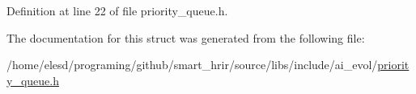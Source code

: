 Definition at line 22 of file priority\-\_\-queue.\-h.



The documentation for this struct was generated from the following file\-:\begin{DoxyCompactItemize}
\item 
/home/elesd/programing/github/smart\-\_\-hrir/source/libs/include/ai\-\_\-evol/\hyperlink{a00011}{priority\-\_\-queue.\-h}\end{DoxyCompactItemize}
